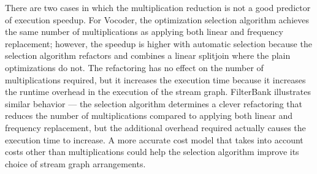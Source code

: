There are two cases in which the multiplication reduction is not a
good predictor of execution speedup.  For Vocoder, the optimization
selection algorithm achieves the same number of multiplications as
applying both linear and frequency replacement; however, the speedup
is higher with automatic selection because the selection
algorithm refactors and combines a linear splitjoin where the plain
optimizations do not. The refactoring has no effect on the number of
multiplications required, but it increases the execution time because
it increases the runtime overhead in the execution of the stream graph.  
FilterBank illustrates similar behavior --- the selection algorithm 
determines a clever refactoring that reduces the number of 
multiplications compared to applying both linear and frequency replacement, but the additional
overhead required actually causes the execution time to
increase. A more accurate cost model that takes into account costs
other than multiplications could help the selection algorithm improve
its choice of stream graph arrangements.

